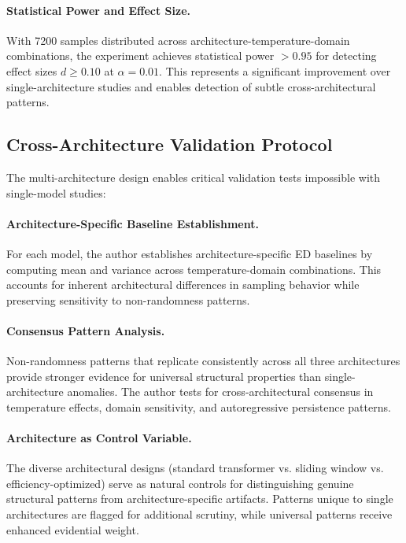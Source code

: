 \documentclass[12pt]{article}
\begin{document}
\paragraph{Statistical Power and Effect Size.}
With 7200 samples distributed across architecture-temperature-domain combinations, the experiment achieves statistical power $>0.95$ for detecting effect sizes $d \geq 0.10$ at $\alpha = 0.01$. This represents a significant improvement over single-architecture studies and enables detection of subtle cross-architectural patterns.

\subsection{Cross-Architecture Validation Protocol}

The multi-architecture design enables critical validation tests impossible with single-model studies:

\paragraph{Architecture-Specific Baseline Establishment.}
For each model, the author establishes architecture-specific ED baselines by computing mean and variance across temperature-domain combinations. This accounts for inherent architectural differences in sampling behavior while preserving sensitivity to non-randomness patterns.

\paragraph{Consensus Pattern Analysis.}
Non-randomness patterns that replicate consistently across all three architectures provide stronger evidence for universal structural properties than single-architecture anomalies. The author tests for cross-architectural consensus in temperature effects, domain sensitivity, and autoregressive persistence patterns.

\paragraph{Architecture as Control Variable.}
The diverse architectural designs (standard transformer vs. sliding window vs. efficiency-optimized) serve as natural controls for distinguishing genuine structural patterns from architecture-specific artifacts. Patterns unique to single architectures are flagged for additional scrutiny, while universal patterns receive enhanced evidential weight.
\end{document}
